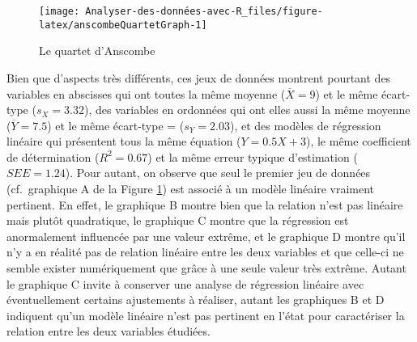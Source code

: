 \documentclass[
  french,
]{book}
\begin{document}
\begin{figure}

{\centering \texttt{[image: Analyser-des-données-avec-R\_files/figure-latex/anscombeQuartetGraph-1]} 

}

\caption{Le quartet d'Anscombe}\label{fig:anscombeQuartetGraph}
\end{figure}

Bien que d'aspects très différents, ces jeux de données montrent pourtant des variables en abscisses qui ont toutes la même moyenne (\(\overline{X} = 9\)) et le même écart-type (\(s_{X} = 3.32\)), des variables en ordonnées qui ont elles aussi la même moyenne (\(\overline{Y} = 7.5\)) et le même écart-type = (\(s_{Y} = 2.03\)), et des modèles de régression linéaire qui présentent tous la même équation (\(Y = 0.5X + 3\)), le même coefficient de détermination (\(R^2 = 0.67\)) et la même erreur typique d'estimation (\(SEE = 1.24\)). Pour autant, on observe que seul le premier jeu de données (cf.~graphique A de la Figure \ref{fig:anscombeQuartetGraph}) est associé à un modèle linéaire vraiment pertinent. En effet, le graphique B montre bien que la relation n'est pas linéaire mais plutôt quadratique, le graphique C montre que la régression est anormalement influencée par une valeur extrême, et le graphique D montre qu'il n'y a en réalité pas de relation linéaire entre les deux variables et que celle-ci ne semble exister numériquement que grâce à une seule valeur très extrême. Autant le graphique C invite à conserver une analyse de régression linéaire avec éventuellement certains ajustements à réaliser, autant les graphiques B et D indiquent qu'un modèle linéaire n'est pas pertinent en l'état pour caractériser la relation entre les deux variables étudiées.

\printbibliography[title=Références, heading=bibintoc]
\end{document}
